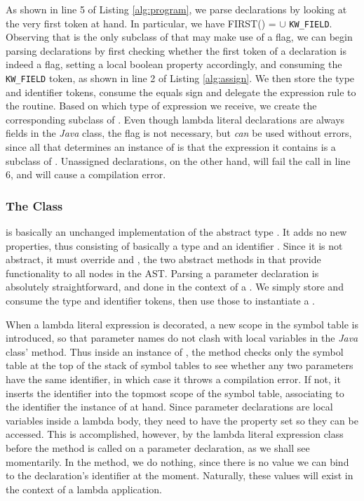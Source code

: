 As shown in line 5 of Listing \ref{alg:program}, we parse declarations by looking at the very first token at hand. In particular, we have FIRST() =  $\cup$ \texttt{KW\_FIELD}. Observing that  is the only subclass of  that may make use of a  flag, we can begin parsing declarations by first checking whether the first token of a declaration is indeed a  flag, setting a local boolean property accordingly, and consuming the \texttt{KW\_FIELD} token, as shown in line 2 of Listing \ref{alg:assign}. We then store the type and identifier tokens, consume the equals sign and delegate the expression rule to the  routine. Based on which type of expression we receive, we create the corresponding subclass of . Even though lambda literal declarations are always fields in the \emph{Java} class, the  flag is not necessary, but \emph{can} be used without errors, since all that determines an instance of  is that the expression it contains is a subclass of . Unassigned declarations, on the other hand, will fail the  call in line 6, and will cause a compilation error.

\subsubsection{The  Class}

 is basically an unchanged implementation of the abstract type . It adds no new properties, thus consisting of basically a type  and an identifier . Since it is not abstract, it must override  and , the two abstract methods in  that provide functionality to all nodes in the AST. Parsing a parameter declaration is absolutely straightforward, and done in the context of a . We simply store and consume the type and identifier tokens, then use those to instantiate a .

When a lambda literal expression is decorated, a new scope in the symbol table is introduced, so that parameter names do not clash with local variables in the \emph{Java} class'  method. Thus inside an instance of , the  method checks only the symbol table at the top of the stack of symbol tables to see whether any two parameters have the same identifier, in which case it throws a compilation error. If not, it inserts the identifier into the topmost scope of the symbol table, associating to the identifier the instance of  at hand. Since parameter declarations are local variables inside a lambda body, they need to have the  property set so they can be accessed. This is accomplished, however, by the lambda literal expression class before the  method is called on a parameter declaration, as we shall see momentarily. In the  method, we do nothing, since there is no value we can bind to the declaration's identifier at the moment. Naturally, these values will exist in the context of a lambda application.

